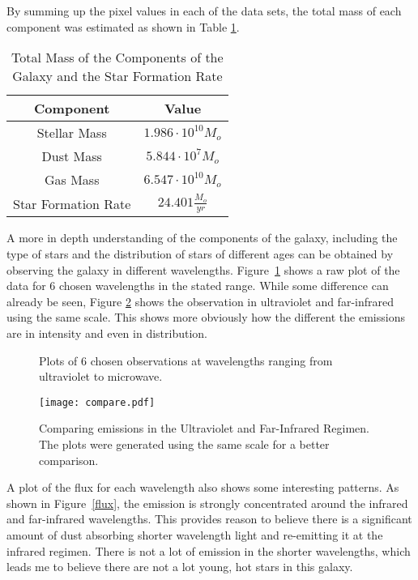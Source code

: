 \documentclass[10pt, preprint]{aastex}
\begin{document}
By summing up the pixel values in each of the data sets, the total mass of each component was estimated as shown in Table \ref{Totals}.

\begin{table}[H]
\centering
\begin{tabular}{|c|c|}
\hline
Component & Value\\\hline
Stellar Mass & $1.986 \cdot 10^{10} M_{o}$\\
Dust Mass & $5.844 \cdot 10^{7} M_{o}$\\
Gas Mass & $6.547\cdot 10^{10} M_{o}$\\
Star Formation Rate & $24.401 \frac{M_{o}}{yr}$\\\hline
\end{tabular}
\caption{\label{Totals}Total Mass of the Components of the Galaxy and the Star Formation Rate}
\end{table}

A more in depth understanding of the components of the galaxy, including the type of stars and the distribution of stars of different ages can be obtained by observing the galaxy in different wavelengths. Figure~\ref{wavelength images} shows a raw plot of the data for 6 chosen wavelengths in the stated range. While some difference can already be seen, Figure \ref{compare} shows the observation in ultraviolet and far-infrared using the same scale. This shows more obviously how the different the emissions are in intensity and even in distribution.

\begin{figure}[H]
\caption{\label{wavelength images}Plots of 6 chosen observations at wavelengths ranging from ultraviolet to microwave.}
\end{figure}

\begin{figure}[h!]
    \centering
    \texttt{[image: compare.pdf]}
    \caption{Comparing emissions in the Ultraviolet and Far-Infrared Regimen. The plots were generated using the same scale for a better comparison.}
    \label{compare}
\end{figure}

A plot of the flux for each wavelength also shows some interesting patterns. As shown in Figure~\ref{flux}, the emission is strongly concentrated around the infrared and far-infrared wavelengths. This provides reason to believe there is a significant amount of dust absorbing shorter wavelength light and re-emitting it at the infrared regimen. There is not a lot of emission in the shorter wavelengths, which leads me to believe there are not a lot young, hot stars in this galaxy.
\end{document}
